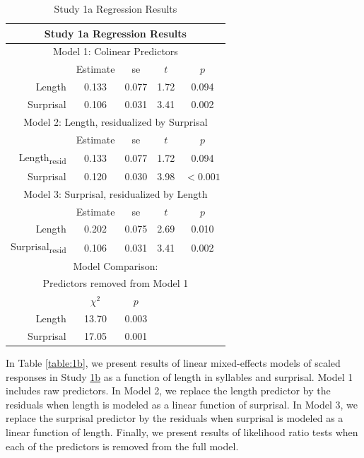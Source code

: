 \begin{appendices}
\begin{table}[h]
\footnotesize
\center
\begin{tabular}{r|cccc}
\hline
\hline
\multicolumn{5}{c}{\textbf{Study 1a Regression Results}} \\
\hline
\hline
\multicolumn{5}{c}{Model 1: Colinear Predictors} \\
& Estimate & se & $t$ & $p$ \\
\hline
Length & 0.133 & 0.077 & 1.72 & 0.094 \\
Surprisal & 0.106 & 0.031 & 3.41 & 0.002 \\
\hline
\hline
\multicolumn{5}{c}{Model 2: Length, residualized by Surprisal} \\
& Estimate & se & $t$ & $p$ \\
\hline
Length\textsubscript{resid} & 0.133 & 0.077 & 1.72 & 0.094 \\
Surprisal & 0.120 & 0.030 & 3.98 & $<0.001$ \\
\hline
\hline
\multicolumn{5}{c}{Model 3: Surprisal, residualized by Length} \\
& Estimate & se & $t$ & $p$ \\
\hline
Length & 0.202 & 0.075 & 2.69 & 0.010 \\
Surprisal\textsubscript{resid} & 0.106 & 0.031 & 3.41 & 0.002 \\
\hline
\hline
\multicolumn{5}{c}{Model Comparison:} \\
\multicolumn{5}{c}{Predictors removed from Model 1} \\
& $\chi^2$ & $p$ \\
\hline
Length & 13.70 & 0.003 \\
Surprisal & 17.05 & 0.001 \\
\hline
\hline
\end{tabular}
\caption{Study 1a Regression Results}
\label{table:1a}
\end{table}




In Table \ref{table:1b}, we present results of linear mixed-effects models of scaled responses in Study \hyperref[sec:study1b]{1b} as a function of length in syllables and surprisal.
Model 1 includes raw predictors.
In Model 2, we replace the length predictor by the residuals when length is modeled as a linear function of surprisal.
In Model 3, we replace the surprisal predictor by the residuals when surprisal is modeled as a linear function of length.
Finally, we present results of likelihood ratio tests when each of the predictors is removed from the full model.


\end{appendices}
